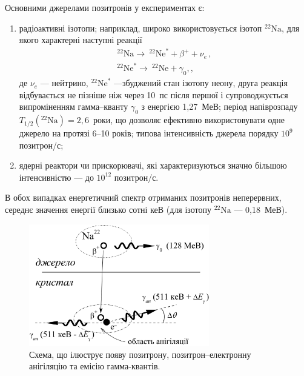 \documentclass[10pt,a5paper,titlepage,oneside]{book}
\numberwithin{equation}{part}
\begin{document}
Основними джерелами позитронів у експериментах є:
\begin{enumerate}[label=\asbuk*),leftmargin=0em,itemindent=1.5em]
  \item радіоактивні ізотопи;
  наприклад,  широко використовується ізотоп $^{22}\text{Na}$, для якого характерні наступні реакції
  \begin{gather*}
  ^{22}\text{Na}\rightarrow \:^{22}\text{Ne}^{*}+\beta^++\nu_e\,,\\
  ^{22}\text{Ne}^{*}\rightarrow \:^{22}\text{Ne}+\gamma_{0},,
  \end{gather*}
де
$\nu_e$ --- нейтрино,
$^{22}\text{Ne}^{*}$ ---збуджений стан ізотопу неону,
друга реакція відбувається не пізніше ніж через 10~пс після першої і супроводжується
випроміненням гамма--кванту $\gamma_0$ з енергією 1,27~МеВ;
період напіврозпаду $T_{1/2}(^{22}\text{Na})=2,6$~роки, що
дозволяє ефективно використовувати одне джерело на протязі 6--10 років;
 типова інтенсивність джерела порядку $10^9$ позитрон/с;
  \item ядерні реактори чи прискорювачі, які характеризуються значно більшою інтенсивністю --- до $10^{12}$ позитрон/с.
\end{enumerate}
В обох випадках енергетичний спектр отриманих позитронів неперервних,
середнє значення енергії близько сотні кеВ (для ізотопу $^{22}\text{Na}$ --- 0,18~МеВ).

\begin{figure}[t]
\center
\vspace{-5mm}
\includegraphics[width=0.7\textwidth]{Fig3_0}
\vspace{-3mm}
\caption{Схема, що ілюструє появу позитрону, позитрон--електронну анігіляцію
та емісію гамма-квантів.}
\vspace{-3mm}
\label{F30}
\end{figure}
\end{document}
